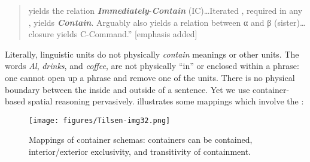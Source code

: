 \begin{quote}
     yields the relation \textbf{\textit{Immediately}}{}-\textbf{\textit{Contain}} (IC)…Iterated , required in any , yields \textbf{\textit{Contain}}. Arguably  also yields a relation between α and β (sister)…  closure yields C-Command.” \citep[3]{Chomsky2001b} [emphasis added]
\end{quote}

  Literally, linguistic units do not physically \textit{contain} meanings or other units. The words \textit{Al}, \textit{drinks}, and \textit{coffee}, are not physically “in” or enclosed within a phrase: one cannot open up a phrase and remove one of the units. There is no physical boundary between the inside and outside of a sentence. Yet we use container-based spatial reasoning pervasively. {} illustrates some mappings which involve the :

  
\begin{figure}
\texttt{[image: figures/Tilsen-img32.png]}
\caption{Mappings of container schemas: containers can be contained, interior/exterior exclusivity, and transitivity of containment.}
\label{fig:3:4}
\end{figure}
 

